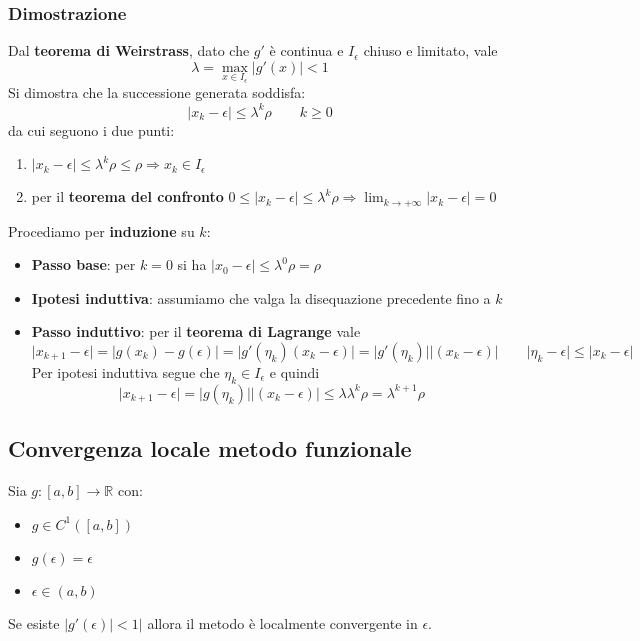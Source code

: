 \subsubsection{Dimostrazione}
Dal \textbf{teorema di Weirstrass}, dato che $g'$ è continua e $I_\epsilon$ chiuso e limitato, vale
\begin{equation*}
	\lambda = \max_{x \in I_\epsilon}\lvert g'(x) \rvert < 1
\end{equation*}
Si dimostra che la successione generata soddisfa:
\begin{equation*}
	\lvert x_k - \epsilon \rvert \leq \lambda^k \rho \quad\quad k \geq 0
\end{equation*}
da cui seguono i due punti:
\begin{enumerate}
	\item $\lvert x_k - \epsilon \rvert \leq \lambda^k \rho \leq \rho \Longrightarrow x_k \in I_\epsilon$
	\item per il \textbf{teorema del confronto} $0 \leq \lvert x_k -\epsilon \rvert \leq \lambda^k \rho \Longrightarrow \lim_{k \to +\infty} \lvert x_k - \epsilon \rvert = 0$
\end{enumerate}
Procediamo per \textbf{induzione} su $k$:
\begin{itemize}
	\item \textbf{Passo base}: per $k=0$ si ha $\lvert x_0 - \epsilon \rvert \leq \lambda^0 \rho = \rho$
	\item \textbf{Ipotesi induttiva}: assumiamo che valga la disequazione precedente fino a $k$
	\item \textbf{Passo induttivo}: per il \textbf{teorema di Lagrange} vale
	\begin{equation*}
		\lvert x_{k+1} - \epsilon \rvert = \lvert g(x_k) - g(\epsilon) \rvert = \lvert g'(\eta_k)(x_k - \epsilon) \rvert = \lvert g'(\eta_k)\rvert \lvert (x_k - \epsilon) \rvert \quad\quad \lvert \eta_k - \epsilon \rvert \leq \lvert x_k - \epsilon \rvert
	\end{equation*} 
	Per ipotesi induttiva segue che $\eta_k \in I_\epsilon$ e quindi
	\begin{equation*}
		\lvert x_{k+1} - \epsilon \rvert = \lvert g(\eta_k)\rvert\lvert(x_k - \epsilon) \rvert \leq \lambda \lambda^k \rho = \lambda^{k+1}\rho
	\end{equation*}
\end{itemize}
\subsection{Convergenza locale metodo funzionale}
\begin{theorem}
	Sia $g:[a,b]\to \mathbb{R}$ con:
	\begin{itemize}
		\item $g \in C^1([a,b])$
		\item $g(\epsilon) = \epsilon$
		\item $\epsilon \in (a,b)$
	\end{itemize}
	Se esiste $\lvert g'(\epsilon) \rvert  < 1 \rvert$ allora il metodo è localmente convergente in $\epsilon$.
\end{theorem}
